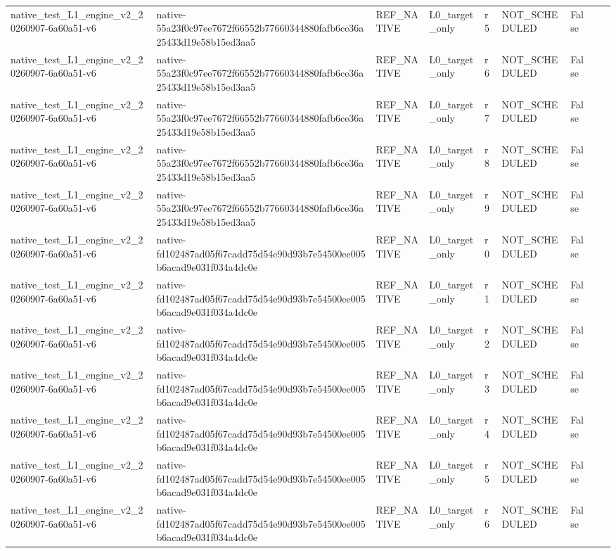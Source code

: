 \begin{tabular}{lllllllll}
native\_test\_L1\_engine\_v2\_20260907-6a60a51-v6 & native-55a23f0c97ee7672f66552b77660344880fafb6ce36a25433d19e58b15ed3aa5 & REF\_NATIVE & L0\_target\_only & r5 & NOT\_SCHEDULED & False &  &  \\
native\_test\_L1\_engine\_v2\_20260907-6a60a51-v6 & native-55a23f0c97ee7672f66552b77660344880fafb6ce36a25433d19e58b15ed3aa5 & REF\_NATIVE & L0\_target\_only & r6 & NOT\_SCHEDULED & False &  &  \\
native\_test\_L1\_engine\_v2\_20260907-6a60a51-v6 & native-55a23f0c97ee7672f66552b77660344880fafb6ce36a25433d19e58b15ed3aa5 & REF\_NATIVE & L0\_target\_only & r7 & NOT\_SCHEDULED & False &  &  \\
native\_test\_L1\_engine\_v2\_20260907-6a60a51-v6 & native-55a23f0c97ee7672f66552b77660344880fafb6ce36a25433d19e58b15ed3aa5 & REF\_NATIVE & L0\_target\_only & r8 & NOT\_SCHEDULED & False &  &  \\
native\_test\_L1\_engine\_v2\_20260907-6a60a51-v6 & native-55a23f0c97ee7672f66552b77660344880fafb6ce36a25433d19e58b15ed3aa5 & REF\_NATIVE & L0\_target\_only & r9 & NOT\_SCHEDULED & False &  &  \\
native\_test\_L1\_engine\_v2\_20260907-6a60a51-v6 & native-fd102487ad05f67cadd75d54e90d93b7e54500ee005b6acad9e031f034a4dc0e & REF\_NATIVE & L0\_target\_only & r0 & NOT\_SCHEDULED & False &  &  \\
native\_test\_L1\_engine\_v2\_20260907-6a60a51-v6 & native-fd102487ad05f67cadd75d54e90d93b7e54500ee005b6acad9e031f034a4dc0e & REF\_NATIVE & L0\_target\_only & r1 & NOT\_SCHEDULED & False &  &  \\
native\_test\_L1\_engine\_v2\_20260907-6a60a51-v6 & native-fd102487ad05f67cadd75d54e90d93b7e54500ee005b6acad9e031f034a4dc0e & REF\_NATIVE & L0\_target\_only & r2 & NOT\_SCHEDULED & False &  &  \\
native\_test\_L1\_engine\_v2\_20260907-6a60a51-v6 & native-fd102487ad05f67cadd75d54e90d93b7e54500ee005b6acad9e031f034a4dc0e & REF\_NATIVE & L0\_target\_only & r3 & NOT\_SCHEDULED & False &  &  \\
native\_test\_L1\_engine\_v2\_20260907-6a60a51-v6 & native-fd102487ad05f67cadd75d54e90d93b7e54500ee005b6acad9e031f034a4dc0e & REF\_NATIVE & L0\_target\_only & r4 & NOT\_SCHEDULED & False &  &  \\
native\_test\_L1\_engine\_v2\_20260907-6a60a51-v6 & native-fd102487ad05f67cadd75d54e90d93b7e54500ee005b6acad9e031f034a4dc0e & REF\_NATIVE & L0\_target\_only & r5 & NOT\_SCHEDULED & False &  &  \\
native\_test\_L1\_engine\_v2\_20260907-6a60a51-v6 & native-fd102487ad05f67cadd75d54e90d93b7e54500ee005b6acad9e031f034a4dc0e & REF\_NATIVE & L0\_target\_only & r6 & NOT\_SCHEDULED & False &  &  \\

\end{tabular}
